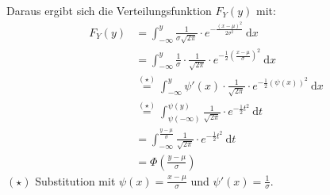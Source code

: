 \documentclass[a4paper]{scrartcl}
\newcommand{\dif}{\ \mathrm{d}}
\def \blattnr {5}
\begin{document}
\begin{enumerate}[label=\bfseries \blattnr.\arabic*]
\begin{enumerate}
	      Daraus ergibt sich die Verteilungsfunktion $F_Y(y)$ mit:
          \begin{equation*}
              \begin{split}
                  F_Y(y)
                  &= \int_{-\infty}^y \frac{1}{\sigma\sqrt{2\pi}} \cdot
                    e^{-\frac{(x-\mu)^2}{2\sigma^2}} \dif x \\
                  &= \int_{-\infty}^y \frac{1}{\sigma} \cdot \frac{1}{\sqrt{2\pi}}
                    \cdot e^{-\frac{1}{2}\left(\frac{x-\mu}{\sigma}\right)^2}
                    \dif x \\
                  &\stackrel{(\star)}{=} \int_{-\infty}^y \psi'(x) \cdot
                    \frac{1}{\sqrt{2\pi}} \cdot e^{-\frac{1}{2}(\psi(x))^2}
                    \dif x \\
                  &\stackrel{(\star)}{=} \int_{\psi(-\infty)}^{\psi(y)}
                    \frac{1}{\sqrt{2\pi}} \cdot e^{-\frac{1}{2}t^2} \dif t \\
                  &= \int_{-\infty}^{\frac{y-\mu}{\sigma}}
                    \frac{1}{\sqrt{2\pi}} \cdot e^{-\frac{1}{2}t^2} \dif t \\
                  &= \Phi \left( \frac{y-\mu}{\sigma} \right)
              \end{split}
          \end{equation*}
          $(\star)$ Substitution mit $\psi(x) = \frac{x-\mu}{\sigma}$ und
          $\psi'(x) = \frac{1}{\sigma}$.
	      

\end{enumerate}
\end{enumerate}
\end{document}
